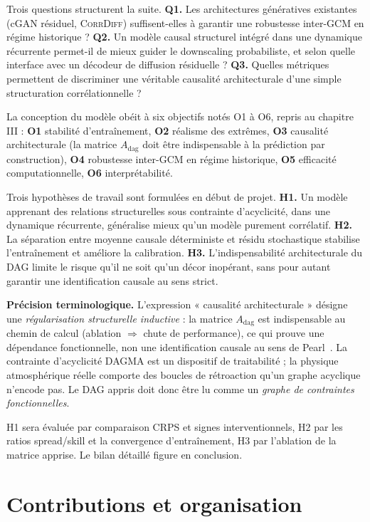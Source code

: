 \documentclass[14pt,a4paper,openany]{extreport}
\theoremstyle{definition}
\newcommand{\CorrDiff}{\textsc{CorrDiff}}
\newcommand{\Adag}{\ensuremath{A_{\mathrm{dag}}}}
\begin{document}
Trois questions structurent la suite. \textbf{Q1.} Les architectures génératives existantes (cGAN résiduel, \CorrDiff{}) suffisent-elles à garantir une robustesse inter-GCM en régime historique ? \textbf{Q2.} Un modèle causal structurel intégré dans une dynamique récurrente permet-il de mieux guider le downscaling probabiliste, et selon quelle interface avec un décodeur de diffusion résiduelle ? \textbf{Q3.} Quelles métriques permettent de discriminer une véritable causalité architecturale d'une simple structuration corrélationnelle ?

La conception du modèle obéit à six objectifs notés O1 à O6, repris au chapitre III : \textbf{O1} stabilité d'entraînement, \textbf{O2} réalisme des extrêmes, \textbf{O3} causalité architecturale (la matrice $\Adag$ doit être indispensable à la prédiction par construction), \textbf{O4} robustesse inter-GCM en régime historique, \textbf{O5} efficacité computationnelle, \textbf{O6} interprétabilité.

Trois hypothèses de travail sont formulées en début de projet. \textbf{H1.} Un modèle apprenant des relations structurelles sous contrainte d'acyclicité, dans une dynamique récurrente, généralise mieux qu'un modèle purement corrélatif. \textbf{H2.} La séparation entre moyenne causale déterministe et résidu stochastique stabilise l'entraînement et améliore la calibration. \textbf{H3.} L'indispensabilité architecturale du DAG limite le risque qu'il ne soit qu'un décor inopérant, sans pour autant garantir une identification causale au sens strict.

\noindent\textbf{Précision terminologique.} L'expression « causalité architecturale » désigne une \emph{régularisation structurelle inductive} : la matrice $\Adag$ est indispensable au chemin de calcul (ablation $\Rightarrow$ chute de performance), ce qui prouve une dépendance fonctionnelle, non une identification causale au sens de Pearl~\cite{pearl_causality_2009}. La contrainte d'acyclicité DAGMA est un dispositif de traitabilité ; la physique atmosphérique réelle comporte des boucles de rétroaction qu'un graphe acyclique n'encode pas. Le DAG appris doit donc être lu comme un \emph{graphe de contraintes fonctionnelles}.

H1 sera évaluée par comparaison CRPS et signes interventionnels, H2 par les ratios spread/skill et la convergence d'entraînement, H3 par l'ablation de la matrice apprise. Le bilan détaillé figure en conclusion.

\section*{Contributions et organisation}
\end{document}
